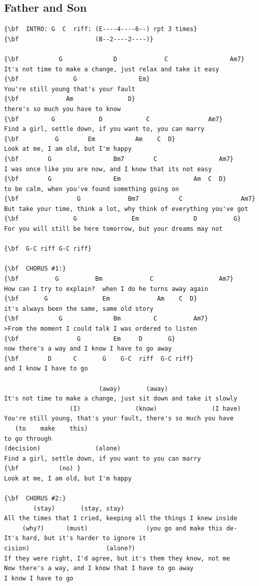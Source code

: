 \documentclass[a4paper]{article}
\begin{document}
\subsection{Father and Son}
\begin{Verbatim}[commandchars=\\\{\}]
{\bf  INTRO: G  C  riff: (E----4----6--) rpt 3 times}
{\bf                     (B--2----2----)}

{\bf           G              D             C                 Am7}
It's not time to make a change, just relax and take it easy
{\bf               G                 Em}
You're still young that's your fault
{\bf             Am               D}
there's so much you have to know
{\bf         G            D            C                Am7}
Find a girl, settle down, if you want to, you can marry
{\bf          G        Em           Am    C  D}
Look at me, I am old, but I'm happy
{\bf        G                 Bm7        C                 Am7}
I was once like you are now, and I know that its not easy
{\bf        G                 Em                    Am  C  D}
to be calm, when you've found something going on
{\bf                G             Bm7           C                Am7}
But take your time, think a lot, why think of everything you've got
{\bf               G               Em               D          G}
For you will still be here tomorrow, but your dreams may not

{\bf  G-C riff G-C riff}

{\bf  CHORUS #1:}
{\bf          G          Bm             C                  Am7}
How can I try to explain?  when I do he turns away again
{\bf       G               Em             Am    C  D}
it's always been the same, same old story
{\bf           G              Bm         C          Am7}
>From the moment I could talk I was ordered to listen
{\bf                G         Em     D       G}
now there's a way and I know I have to go away
{\bf        D      C       G    G-C  riff  G-C riff}
and I know I have to go

                          (away)       (away)
It's not time to make a change, just sit down and take it slowly
                  (I)               (know)               (I have)
You're still young, that's your fault, there's so much you have
   (to    make    this)
to go through
(decision)               (alone)
Find a girl, settle down, if you want to you can marry
{\bf           (no) }
Look at me, I am old, but I'm happy

{\bf  CHORUS #2:}
        (stay)       (stay, stay)
All the times that I cried, keeping all the things I knew inside
     (why?)      (must)                (you go and make this de-
It's hard, but it's harder to ignore it
cision)                     (alone?)
If they were right, I'd agree, but it's them they know, not me
Now there's a way, and I know that I have to go away
I know I have to go

\end{Verbatim}
\newpage
\end{document}
